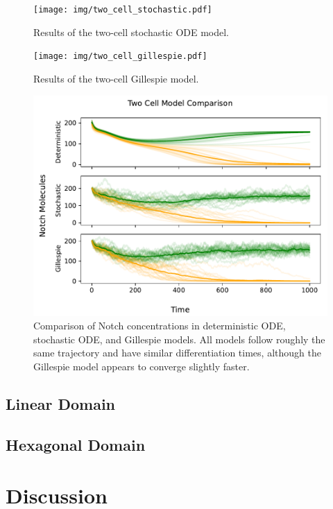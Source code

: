 \documentclass{article}
\begin{document}
\begin{flushleft}
\begin{figure}
  \texttt{[image: img/two\_cell\_stochastic.pdf]}
  \caption{Results of the two-cell stochastic ODE model.}
\end{figure}

\begin{figure}
  \texttt{[image: img/two\_cell\_gillespie.pdf]}
  \caption{Results of the two-cell Gillespie model.}
\end{figure}

\begin{figure}
  \includegraphics[width=\textwidth]{img/two_cell_comparison.pdf}
  \caption{Comparison of Notch concentrations in deterministic ODE, stochastic ODE, and Gillespie models. All models follow roughly the same trajectory and have similar differentiation times, although the Gillespie model appears to converge slightly faster.}
\end{figure}

\subsection{Linear Domain}

\subsection{Hexagonal Domain}

\section{Discussion}

\end{flushleft}

\nocite{*}
\printbibliography
\end{document}
